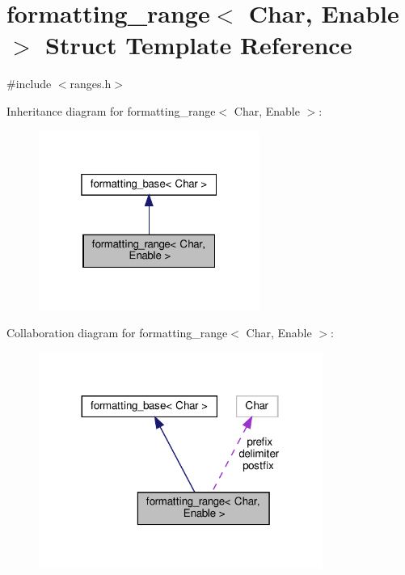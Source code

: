 \hypertarget{structformatting__range}{}\section{formatting\+\_\+range$<$ Char, Enable $>$ Struct Template Reference}
\label{structformatting__range}


{\ttfamily \#include $<$ranges.\+h$>$}



Inheritance diagram for formatting\+\_\+range$<$ Char, Enable $>$\+:
\nopagebreak
\begin{figure}[H]
\begin{center}
\leavevmode
\includegraphics[width=205pt]{structformatting__range__inherit__graph}
\end{center}
\end{figure}


Collaboration diagram for formatting\+\_\+range$<$ Char, Enable $>$\+:
\nopagebreak
\begin{figure}[H]
\begin{center}
\leavevmode
\includegraphics[width=263pt]{structformatting__range__coll__graph}
\end{center}
\end{figure}
